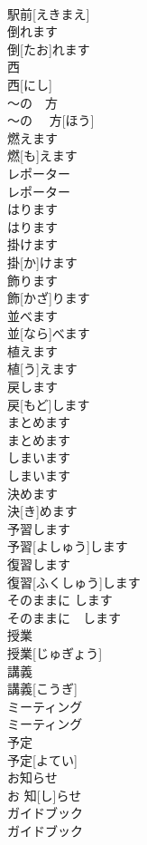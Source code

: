 \documentclass[8pt]{extreport}
\begin{document}
\begin{CJK}{UTF8}{min}
\\	駅前[えきまえ]	
\\	倒れます	
\\	倒[たお]れます	
\\	西	
\\	西[にし]	
\\	〜の　方	
\\	〜の　 方[ほう]	
\\	燃えます	
\\	燃[も]えます	
\\	レポーター	
\\	レポーター	
\\	はります	
\\	はります	
\\	掛けます	
\\	掛[か]けます	
\\	飾ります	
\\	飾[かざ]ります	
\\	並べます	
\\	並[なら]べます	
\\	植えます	
\\	植[う]えます	
\\	戻します	
\\	戻[もど]します	
\\	まとめます	
\\	まとめます	
\\	しまいます	
\\	しまいます	
\\	決めます	
\\	決[き]めます	
\\	予習します	
\\	予習[よしゅう]します	
\\	復習します	
\\	復習[ふくしゅう]します	
\\	そのままに します	
\\	そのままに　します	
\\	授業	
\\	授業[じゅぎょう]	
\\	講義	
\\	講義[こうぎ]	
\\	ミーティング	
\\	ミーティング	
\\	予定	
\\	予定[よてい]	
\\	お知らせ	
\\	お 知[し]らせ	
\\	ガイドブック	
\\	ガイドブック	

\end{CJK}
\end{document}
